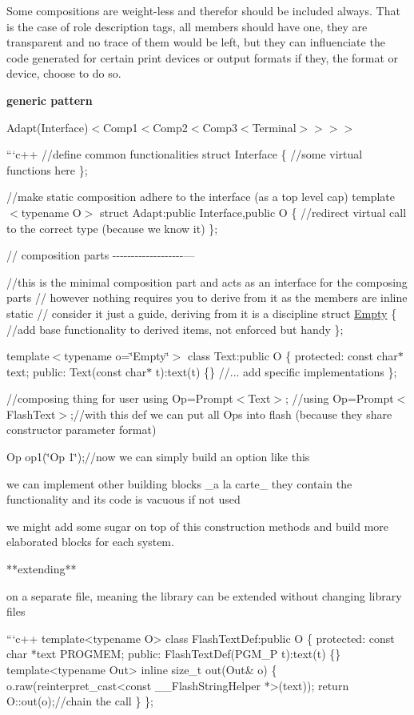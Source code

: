 Some compositions are weight-\/less and therefor should be included always. That is the case of role description tags, all members should have one, they are transparent and no trace of them would be left, but they can influenciate the code generated for certain print devices or output formats if they, the format or device, choose to do so.

{\bfseries generic pattern}

Adapt(\+Interface)$<$Comp1$<$Comp2$<$Comp3$<$\+Terminal$>$$>$$>$$>$

```c++ //define common functionalities struct Interface \{ //some virtual functions here \};

//make static composition adhere to the interface (as a top level cap) template$<$typename O$>$ struct Adapt\+:public Interface,public O \{ //redirect virtual call to the correct type (because we know it) \};

// composition parts -\/-\/-\/-\/-\/-\/-\/-\/-\/-\/-\/-\/-\/-\/-\/-\/-\/-\/-\/---

//this is the minimal composition part and acts as an interface for the composing parts // however nothing requires you to derive from it as the members are {\ttfamily inline static} // consider it just a guide, deriving from it is a discipline struct \hyperlink{structEmpty}{Empty} \{ //add base functionality to derived items, not enforced but handy \};

template$<$typename o=\char`\"{}\+Empty\char`\"{}$>$ class Text\+:public O \{ protected\+: const char$\ast$ text; public\+: Text(const char$\ast$ t)\+:text(t) \{\} //... add specific implementations \};

//composing thing for user using Op=Prompt$<$\+Text$>$; //using Op=Prompt$<$\+Flash\+Text$>$;//with this def we can put all Op\textquotesingle{}s into flash (because they share constructor parameter format)

Op op1(\char`\"{}\+Op 1\char`\"{});//now we can simply build an option like this


\begin{DoxyCode}
we can implement other building blocks \_a la carte\_  
they contain the functionality and its code is vacuous if not used

we might add some sugar on top of this construction methods and build more elaborated blocks for each
       system.

**extending**

on a separate file, meaning the library can be extended without changing library files

```c++
  template<typename O>
  class FlashTextDef:public O \{
  protected:
    const char *text PROGMEM;
  public:
    FlashTextDef(PGM\_P t):text(t) \{\}
    template<typename Out>
    inline size\_t out(Out& o) \{
      o.raw(reinterpret\_cast<const \_\_FlashStringHelper *>(text));
      return O::out(o);//chain the call
    \}
  \};
\end{DoxyCode}


